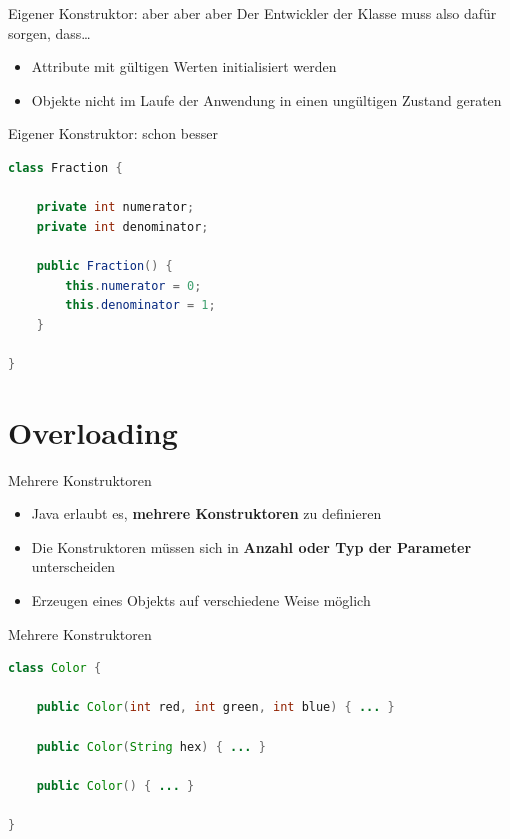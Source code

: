 \documentclass[18pt]{beamer}
\begin{document}
\begin{frame}{Eigener Konstruktor: aber aber aber}
    Der Entwickler der Klasse muss also dafür sorgen, dass\dots
    \begin{itemize}
        \item Attribute mit gültigen Werten initialisiert werden
        \item Objekte nicht im Laufe der Anwendung in einen ungültigen Zustand geraten
    \end{itemize}
\end{frame}

\begin{frame}[fragile]{Eigener Konstruktor: schon besser}
    \begin{exampleblock}{}
        \begin{lstlisting}[language=Java]
class Fraction {

    private int numerator;
    private int denominator;

    public Fraction() {
        this.numerator = 0;
        this.denominator = 1;
    }

}
        \end{lstlisting}
    \end{exampleblock}
\end{frame}


\section{Overloading}

\begin{frame}{Mehrere Konstruktoren}
    \begin{itemize}
        \item Java erlaubt es, \textbf{mehrere Konstruktoren} zu definieren
        \item Die Konstruktoren müssen sich in \textbf{Anzahl oder Typ der Parameter} unterscheiden
        \item Erzeugen eines Objekts auf verschiedene Weise möglich
    \end{itemize}
\end{frame}

\begin{frame}[fragile]{Mehrere Konstruktoren}
    \begin{lstlisting}[language=Java]
class Color {

    public Color(int red, int green, int blue) { ... }

    public Color(String hex) { ... }

    public Color() { ... }

}
    \end{lstlisting}
\end{frame}
\end{document}
